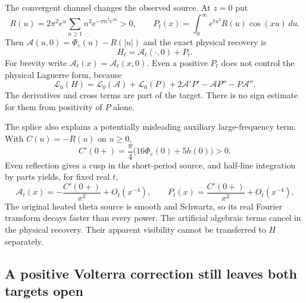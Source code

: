 \documentclass[11pt]{article}
\numberwithin{equation}{section}
\theoremstyle{definition}
\theoremstyle{remark}
\begin{document}
The convergent channel changes the observed source.  At $z=0$ put
\begin{equation}
 R(u)=2\pi^2e^u\sum_{n\ge1}n^2e^{-\pi n^2e^{4u}}>0,
 \qquad
 P_t(x)=\int_0^\infty e^{tu^2}R(u)\cos(xu)\,du.
 \label{eq:theta-correction-source}
\end{equation}
Then $\mathcal A(u,0)=\Phi_e(u)-R(|u|)$ and the exact physical
recovery is
\begin{equation}
 H_t=\mathscr A_t(\cdot,0)+P_t.
 \label{eq:theta-physical-recovery}
\end{equation}
For brevity write $\mathscr A_t(x)=\mathscr A_t(x,0)$.  Even a positive
$P_t$ does not control the physical Laguerre form, because
\begin{equation}
 \mathscr L_0(H)
 =\mathscr L_0(\mathscr A)+\mathscr L_0(P)
     +2\mathscr A'P'-\mathscr A P''-P\mathscr A''.
 \label{eq:theta-cross-balance}
\end{equation}
The derivatives and cross terms are part of the target.  There is no
sign estimate for them from positivity of $P$ alone.

The splice also explains a potentially misleading auxiliary
large-frequency term.  With $C(u)=-R(u)$ on $u\ge0$,
\[
 C'(0+)=\frac\pi4\bigl(16\Phi_e(0)+5h(0)\bigr)>0.
\]
Even reflection gives a cusp in the short-period source, and half-line
integration by parts yields, for fixed real $t$,
\[
 \mathscr A_t(x)=-\frac{C'(0+)}{x^2}+O_t(x^{-4}),
 \qquad
 P_t(x)=\frac{C'(0+)}{x^2}+O_t(x^{-4}).
\]
The original heated theta source is smooth and Schwartz, so its real
Fourier transform decays faster than every power.  The artificial
algebraic terms cancel in the physical recovery.  Their apparent
visibility cannot be transferred to $H$ separately.

\subsection{A positive Volterra correction still leaves both targets open}
\label{sec:theta-volterra}
\end{document}
